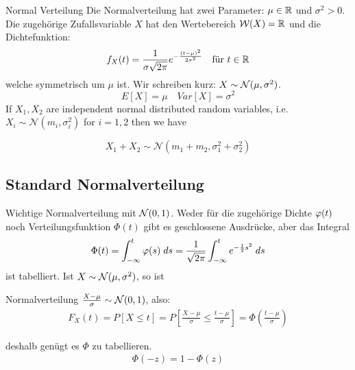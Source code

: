 \begin{definition}{Normal Verteilung}
  Die Normalverteilung hat zwei Parameter: $\mu \in \mathbb{R}$ und $\sigma^2 > 0$. Die
  zugehörige Zufallsvariable $X$ hat den Wertebereich $\mathcal{W} (X) = \mathbb{R}$ und die
  Dichtefunktion:
  \begin{align*}
    f_X (t) = \frac{1}{\sigma \sqrt{2 \pi}} e^{- \frac{{(t - \mu)}^2}{2 \sigma^2}}
     &  & \text{für } t \in \mathbb{R}
  \end{align*}
  welche symmetrisch um $\mu$ ist. Wir schreiben kurz: $X \sim \mathcal{N} (\mu, \sigma^2)$.
  \[
    E[X] = \mu \quad Var[X] = \sigma^{2}
  \]
  If \( X_1, X_2 \) are independent normal distributed random variables, i.e. \( X_i \sim \mathcal{N}(m_i, \sigma_i^2) \) for \( i = 1,2 \) then we have

  \[
    X_1 + X_2 \sim \mathcal{N}(m_1 + m_2, \sigma_1^2 + \sigma_2^2)
  \]
\end{definition}

\subsection{Standard Normalverteilung}
Wichtige Normalverteilung mit $\mathcal{N} (0, 1)$. Weder für die
zugehörige Dichte $\varphi (t)$ noch Verteilungsfunktion $\Phi (t)$ gibt es
geschlossene Ausdrücke, aber das Integral
\begin{align*}
  \Phi (t) = \int_{-\infty}^t \varphi (s) \; ds =
  \frac{1}{\sqrt{2\pi}} \int_{-\infty}^t e^{-\frac{1}{2} s^2} \; ds
\end{align*}
ist tabelliert. Ist $X \sim \mathcal{N} (\mu, \sigma^2)$, so ist
\begin{definition}{Normalverteilung}
  $\frac{X - \mu}{\sigma} \sim \mathcal{N} (0, 1)$, also:
  \begin{align*}
    F_X (t) = P[X \leq t] = P \left[ \frac{X-\mu}{\sigma} \leq \frac{t - \mu}{\sigma} \right] = \Phi \left  ( \frac{t - \mu}{\sigma} \right)
  \end{align*}
\end{definition}
deshalb genügt es $\Phi$ zu tabellieren.
\begin{align*}
  \Phi (-z) = 1 - \Phi (z)
\end{align*}
